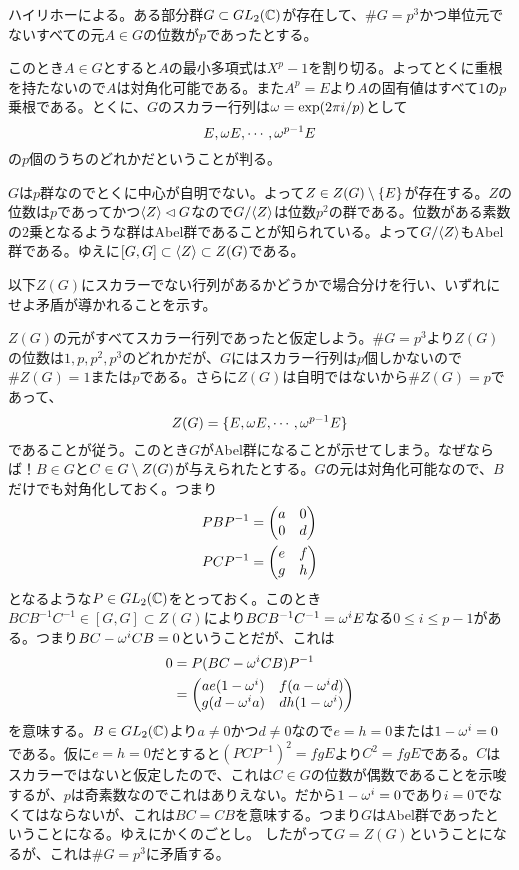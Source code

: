\subsubsection{}%
\begin{sol}
ハイリホーによる。ある部分群$G \subset GL_2({\mathbb C})$が存在して、$\# G = p^3$かつ単位元でないすべての元$A \in G$の位数が$p$であったとする。

このとき$A \in G$とすると$A$の最小多項式は$X^p - 1$を割り切る。よってとくに重根を持たないので$A$は対角化可能である。また$A^p = E$より$A$の固有値はすべて$1$の$p$乗根である。とくに、$G$のスカラー行列は${\omega} = \exp(2 \pi i / p)$として
\[
E, {\omega} E, \cdots , {\omega}^{p-1} E
\]
の$p$個のうちのどれかだということが判る。

$G$は$p$群なのでとくに中心が自明でない。よって$Z \in Z(G) \setminus \{ E \}$が存在する。$Z$の位数は$p$であってかつ$\langle Z \rangle \lhd G$なので$G / \langle Z \rangle$は位数$p^2$の群である。位数がある素数の$2$乗となるような群はAbel群であることが知られている。よって$G / \langle Z \rangle$もAbel群である。ゆえに$[G,G] \subset \langle Z \rangle \subset Z(G)$である。

以下$Z(G)$にスカラーでない行列があるかどうかで場合分けを行い、いずれにせよ矛盾が導かれることを示す。

$Z(G)$の元がすべてスカラー行列であったと仮定しよう。$\# G = p^3$より$Z(G)$の位数は$1, p , p^2, p^3$のどれかだが、$G$にはスカラー行列は$p$個しかないので$\# Z(G) =1$または$p$である。さらに$Z(G)$は自明ではないから$\# Z(G) = p$であって、
\[
Z(G) = \{ E, {\omega} E, \cdots , {\omega}^{p-1} E \}
\]
であることが従う。このとき$G$がAbel群になることが示せてしまう。なぜならば！$B \in G$と$C \in G \setminus Z(G)$が与えられたとする。$G$の元は対角化可能なので、$B$だけでも対角化しておく。つまり
\begin{align*}
  PBP^{-1} &= \begin{pmatrix}  a & 0 \\ 0  & d \end{pmatrix} \\
  PCP^{-1} &= \begin{pmatrix}  e & f \\ g  & h \end{pmatrix}
\end{align*}
となるような$P \in GL_2({\mathbb C})$をとっておく。このとき$BCB^{-1}C^{-1} \in [G,G] \subset Z(G)$により$BCB^{-1}C^{-1} = {\omega}^i E$なる$0 \leq i \leq p-1$がある。つまり$BC - {\omega}^i CB = 0$ということだが、これは
\begin{align*}
  0 &= P(BC - {\omega}^i CB)P^{-1} \\
  &= \begin{pmatrix} ae (1 - {\omega}^i) & f(a-{\omega}^i d) \\ g (d - {\omega}^i a) & dh(1 - {\omega}^i)  \end{pmatrix}
\end{align*}
を意味する。$B \in GL_2({\mathbb C})$より$a \neq 0$かつ$d \neq 0$なので$e = h = 0$または$1 - {\omega}^i = 0$である。仮に$e=h=0$だとすると$(PCP^{-1})^2 = fg E$より$C^2 = fg E$である。$C$はスカラーではないと仮定したので、これは$C \in G$の位数が偶数であることを示唆するが、$p$は奇素数なのでこれはありえない。だから$1 - {\omega}^i = 0$であり$i=0$でなくてはならないが、これは$BC = CB$を意味する。つまり$G$はAbel群であったということになる。ゆえにかくのごとし。
したがって$G = Z(G)$ということになるが、これは$\# G = p^3$に矛盾する。



\end{sol}

